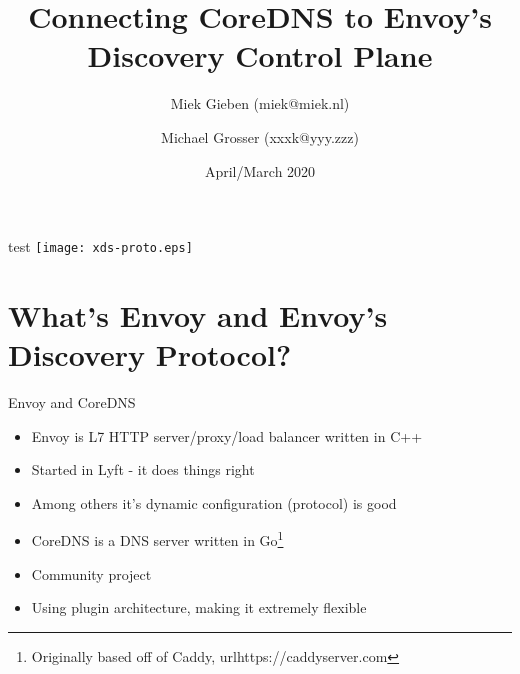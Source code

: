 \documentclass[aspectratio=169]{beamer}
\title{Connecting CoreDNS to Envoy's Discovery Control Plane}
\date{April/March 2020}
\author{Miek Gieben (miek@miek.nl) \and Michael Grosser (xxxk@yyy.zzz)}
\institute{Centre for protobuf Nerding}
\begin{document}
    \let\oldfootnotesize\footnotesize
    \renewcommand*{\footnotesize}{\oldfootnotesize\tiny}

    \maketitle

    \begin{frame}{test}
        \texttt{[image: xds-proto.eps]}
    \end{frame}

    \section{What's Envoy and Envoy's Discovery Protocol?}
    \begin{frame}{Envoy and CoreDNS}
        \begin{itemize}
            \item Envoy is L7 HTTP server/proxy/load balancer written in C++
            \item Started in Lyft - it does things right
            \item Among others it's dynamic configuration (protocol) is good
        \end{itemize}

        \begin{itemize}
            \item CoreDNS is a DNS server written in Go\footnote{Originally based off of Caddy, url{https://caddyserver.com}}
            \item Community project
            \item Using plugin architecture, making it extremely flexible
        \end{itemize}
    \end{frame}
\end{document}
